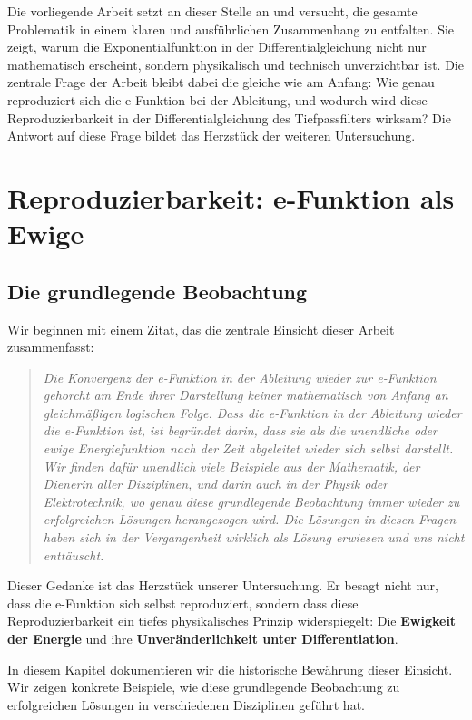 \documentclass[a4paper,12pt,twoside]{report}
\theoremstyle{definition}
\begin{document}
Die vorliegende Arbeit setzt an dieser Stelle an und versucht, die gesamte Problematik in einem klaren und ausführlichen Zusammenhang zu entfalten. Sie zeigt, warum die Exponentialfunktion in der Differentialgleichung nicht nur mathematisch erscheint, sondern physikalisch und technisch unverzichtbar ist. Die zentrale Frage der Arbeit bleibt dabei die gleiche wie am Anfang: Wie genau reproduziert sich die e-Funktion bei der Ableitung, und wodurch wird diese Reproduzierbarkeit in der Differentialgleichung des Tiefpassfilters wirksam? Die Antwort auf diese Frage bildet das Herzstück der weiteren Untersuchung.
\section{Reproduzierbarkeit: e-Funktion als Ewige}

\subsection{Die grundlegende Beobachtung}

Wir beginnen mit einem Zitat, das die zentrale Einsicht dieser Arbeit zusammenfasst:

\begin{quote}
\textit{Die Konvergenz der e-Funktion in der Ableitung wieder zur e-Funktion gehorcht am Ende ihrer Darstellung keiner mathematisch von Anfang an gleichmäßigen logischen Folge. Dass die e-Funktion in der Ableitung wieder die e-Funktion ist, ist begründet darin, dass sie als die unendliche oder ewige Energiefunktion nach der Zeit abgeleitet wieder sich selbst darstellt. Wir finden dafür unendlich viele Beispiele aus der Mathematik, der Dienerin aller Disziplinen, und darin auch in der Physik oder Elektrotechnik, wo genau diese grundlegende Beobachtung immer wieder zu erfolgreichen Lösungen herangezogen wird. Die Lösungen in diesen Fragen haben sich in der Vergangenheit wirklich als Lösung erwiesen und uns nicht enttäuscht.}
\end{quote}

Dieser Gedanke ist das Herzstück unserer Untersuchung. Er besagt nicht nur, dass die e-Funktion sich selbst reproduziert, sondern dass diese Reproduzierbarkeit ein tiefes physikalisches Prinzip widerspiegelt: Die \textbf{Ewigkeit der Energie} und ihre \textbf{Unveränderlichkeit unter Differentiation}.

In diesem Kapitel dokumentieren wir die historische Bewährung dieser Einsicht. Wir zeigen konkrete Beispiele, wie diese grundlegende Beobachtung zu erfolgreichen Lösungen in verschiedenen Disziplinen geführt hat.
\end{document}
